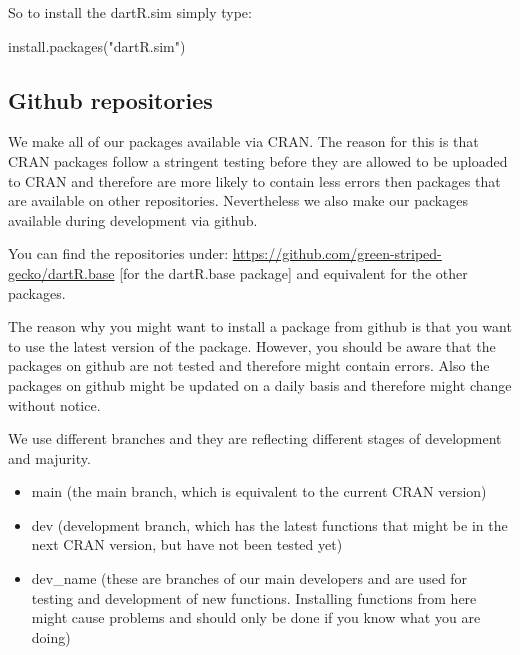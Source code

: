 \documentclass[
  letterpaper,
  DIV=11,
  numbers=noendperiod]{scrreprt}
\newenvironment{Shaded}{\begin{snugshade}}{\end{snugshade}}
\newcommand{\FunctionTok}[1]{\textcolor[rgb]{0.02,0.16,0.49}{#1}}
\newcommand{\NormalTok}[1]{\textcolor[rgb]{0.00,0.44,0.13}{#1}}
\newcommand{\StringTok}[1]{\textcolor[rgb]{0.25,0.44,0.63}{#1}}
\providecommand{\tightlist}{%
  \setlength{\itemsep}{0pt}\setlength{\parskip}{0pt}}\usepackage{longtable,booktabs,array}
\begin{document}
So to install the dartR.sim simply type:

\begin{Shaded}
\begin{Highlighting}[]
\FunctionTok{install.packages}\NormalTok{(}\StringTok{"dartR.sim"}\NormalTok{)}
\end{Highlighting}
\end{Shaded}

\hypertarget{github-repositories}{%
\subsection*{Github repositories}\label{github-repositories}}

We make all of our packages available via CRAN. The reason for this is
that CRAN packages follow a stringent testing before they are allowed to
be uploaded to CRAN and therefore are more likely to contain less errors
then packages that are available on other repositories. Nevertheless we
also make our packages available during development via github.

You can find the repositories under:
\url{https://github.com/green-striped-gecko/dartR.base} {[}for the
dartR.base package{]} and equivalent for the other packages.

The reason why you might want to install a package from github is that
you want to use the latest version of the package. However, you should
be aware that the packages on github are not tested and therefore might
contain errors. Also the packages on github might be updated on a daily
basis and therefore might change without notice.

We use different branches and they are reflecting different stages of
development and majurity.

\begin{itemize}
\tightlist
\item
  main (the main branch, which is equivalent to the current CRAN
  version)
\item
  dev (development branch, which has the latest functions that might be
  in the next CRAN version, but have not been tested yet)
\item
  dev\_name (these are branches of our main developers and are used for
  testing and development of new functions. Installing functions from
  here might cause problems and should only be done if you know what you
  are doing)
\end{itemize}
\end{document}
